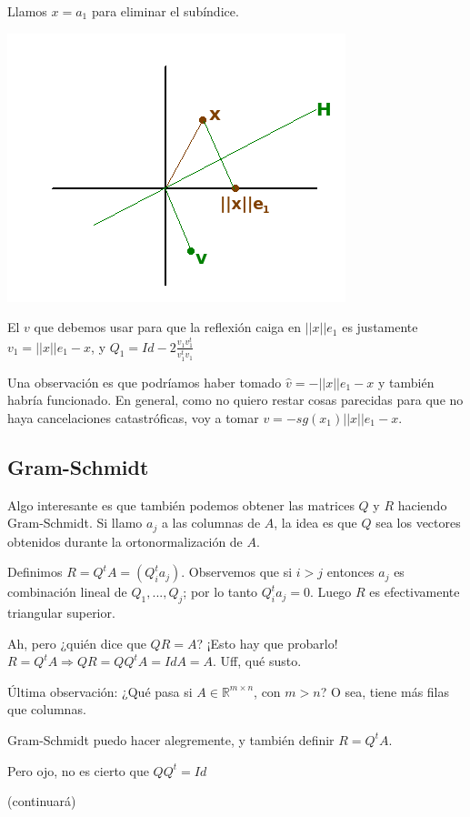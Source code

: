 \documentclass[10pt,a4paper,final]{report}
\begin{document}
Llamos $x=a_1$ para eliminar el subíndice.

\includegraphics[scale=1]{householder2.png}

El $v$ que debemos usar para que la reflexión caiga en $||x||e_1$ es justamente $v_1=||x||e_1 - x$, y $Q_1 = Id - 2 \frac{v_1 v_1^t}{v_1^t v_1}$

Una observación es que podríamos haber tomado $\hat{v} = - ||x||e_1 -x$ y también habría funcionado. En general, como no quiero restar cosas parecidas para que no haya cancelaciones catastróficas, voy a tomar $v= -sg(x_1)||x||e_1-x$.

\subsection*{Gram-Schmidt}

\begin{observation}
	Algo interesante es que también podemos obtener las matrices $Q$ y $R$ haciendo Gram-Schmidt. Si llamo $a_j$ a las columnas de $A$, la idea es que $Q$ sea los vectores obtenidos durante la ortonormalización de $A$.
	
	Definimos $R = Q^t A = (Q_i^t a_j)$. Observemos que si $i>j$ entonces $a_j$ es combinación lineal de $Q_1,...,Q_j$; por lo tanto $Q_i^t a_j = 0$. Luego $R$ es efectivamente triangular superior.
	
Ah, pero ¿quién dice que $QR = A$? ¡Esto hay que probarlo! $R = Q^t A \Rightarrow Q R = Q Q^t A = Id A = A$. Uff, qué susto.

Última observación: ¿Qué pasa si $A \in \mathbb{R}^{m\times n}$, con $m>n$? O sea, tiene más filas que columnas.

Gram-Schmidt puedo hacer alegremente, y también definir $R= Q^t A$.

Pero ojo, no es cierto que $QQ^t = Id$

(continuará)

\end{observation}
\end{document}
